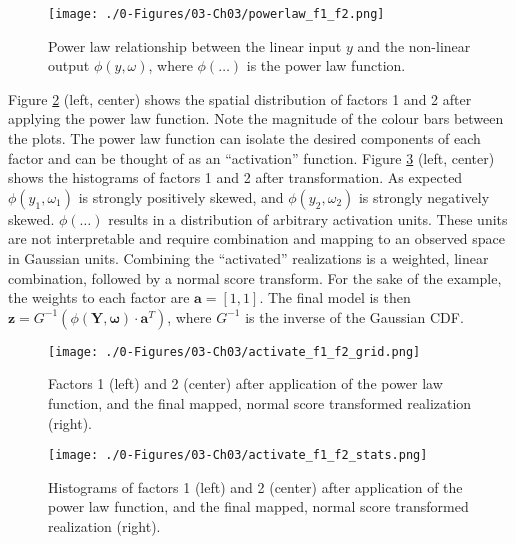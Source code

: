 \begin{figure}[htb!]
    \centering
    \texttt{[image: ./0-Figures/03-Ch03/powerlaw\_f1\_f2.png]}
    \caption{Power law relationship between the linear input $y$ and the non-linear output $\phi(y, \omega)$, where $\phi(\dots)$ is the power law function. }
    \label{fig:powerlaw_f1_f2}
\end{figure}

Figure \ref{fig:activate_f1_f2_grid} (left, center) shows the spatial distribution of factors 1 and 2 after applying the power law function. Note the magnitude of the colour bars between the plots. The power law function can isolate the desired components of each factor and can be thought of as an ``activation'' function. Figure \ref{fig:activate_f1_f2_stats} (left, center) shows the histograms of factors 1 and 2 after transformation. As expected $\phi(y_{1}, \omega_{1})$ is strongly positively skewed, and $\phi(y_{2}, \omega_{2})$ is strongly negatively skewed. $\phi(\dots)$ results in a distribution of arbitrary activation units. These units are not interpretable and require combination and mapping to an observed space in Gaussian units. Combining the ``activated'' realizations is a weighted, linear combination, followed by a normal score transform. For the sake of the example, the weights to each factor are $\mathbf{a} = [1,1]$. The final model is then $\mathbf{z} = G^{-1}(\phi(\mathbf{Y}, \boldsymbol{\omega}) \cdot \mathbf{a}^{T})$, where $G^{-1}$ is the inverse of the Gaussian \gls{CDF}.

\begin{figure}[htb!]
    \centering
    \texttt{[image: ./0-Figures/03-Ch03/activate\_f1\_f2\_grid.png]}
    \caption{Factors 1 (left) and 2 (center) after application of the power law function, and the final mapped, normal score transformed realization (right).}
    \label{fig:activate_f1_f2_grid}
\end{figure}

\begin{figure}[htb!]
    \centering
    \texttt{[image: ./0-Figures/03-Ch03/activate\_f1\_f2\_stats.png]}
    \caption{Histograms of factors 1 (left) and 2 (center) after application of the power law function, and the final mapped, normal score transformed realization (right).}
    \label{fig:activate_f1_f2_stats}
\end{figure}

